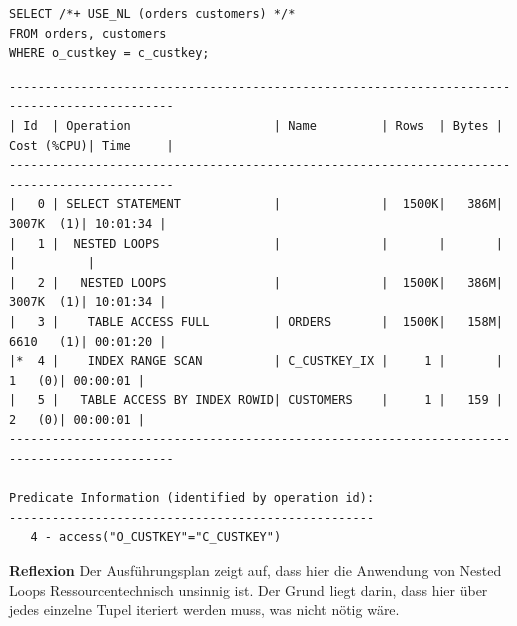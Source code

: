 \documentclass[10pt]{article}
\begin{document}
\begin{lstlisting}[style=sql]
SELECT /*+ USE_NL (orders customers) */*
FROM orders, customers
WHERE o_custkey = c_custkey;
\end{lstlisting}
\begin{lstlisting}[style=queryexecutionplan]
---------------------------------------------------------------------------------------------
| Id  | Operation                    | Name         | Rows  | Bytes | Cost (%CPU)| Time     |
---------------------------------------------------------------------------------------------
|   0 | SELECT STATEMENT             |              |  1500K|   386M|  3007K  (1)| 10:01:34 |
|   1 |  NESTED LOOPS                |              |       |       |            |          |
|   2 |   NESTED LOOPS               |              |  1500K|   386M|  3007K  (1)| 10:01:34 |
|   3 |    TABLE ACCESS FULL         | ORDERS       |  1500K|   158M|  6610   (1)| 00:01:20 |
|*  4 |    INDEX RANGE SCAN          | C_CUSTKEY_IX |     1 |       |     1   (0)| 00:00:01 |
|   5 |   TABLE ACCESS BY INDEX ROWID| CUSTOMERS    |     1 |   159 |     2   (0)| 00:00:01 |
---------------------------------------------------------------------------------------------
 
Predicate Information (identified by operation id):
---------------------------------------------------
   4 - access("O_CUSTKEY"="C_CUSTKEY")
\end{lstlisting}
\textbf{Reflexion} \newline
Der Ausführungsplan zeigt auf, dass hier die Anwendung von Nested Loops Ressourcentechnisch unsinnig ist.
Der Grund liegt darin, dass hier über jedes einzelne Tupel iteriert werden muss, was nicht nötig wäre.
\end{document}
